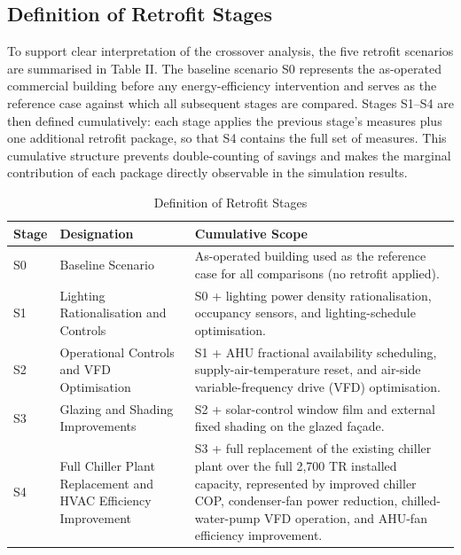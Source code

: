 \documentclass[journal,fleqn]{IEEEtran}
\renewcommand{\arraystretch}{1.08}
\begin{document}
\subsection{Definition of Retrofit Stages}

To support clear interpretation of the crossover analysis, the five retrofit scenarios are summarised in Table II. The baseline scenario S0 represents the as-operated commercial building before any energy-efficiency intervention and serves as the reference case against which all subsequent stages are compared. Stages S1--S4 are then defined cumulatively: each stage applies the previous stage's measures plus one additional retrofit package, so that S4 contains the full set of measures. This cumulative structure prevents double-counting of savings and makes the marginal contribution of each package directly observable in the simulation results.


\begin{table}[!t]
\caption{Definition of Retrofit Stages}
\label{tab:02}
\centering
\footnotesize
\setlength{\tabcolsep}{4pt}
\renewcommand{\arraystretch}{1.16}
\begin{tabularx}{\textwidth}{@{}>{\centering\arraybackslash}p{}>{\raggedright\arraybackslash}p{}>{\raggedright\arraybackslash}X@{}}
\toprule
\textbf{Stage} & \textbf{Designation} & \textbf{Cumulative Scope} \\
\midrule
S0 & Baseline Scenario & As-operated building used as the reference case for all comparisons (no retrofit applied). \\
S1 & Lighting Rationalisation and Controls & S0 + lighting power density rationalisation, occupancy sensors, and lighting-schedule optimisation. \\
S2 & Operational Controls and VFD Optimisation & S1 + AHU fractional availability scheduling, supply-air-temperature reset, and air-side variable-frequency drive (VFD) optimisation. \\
S3 & Glazing and Shading Improvements & S2 + solar-control window film and external fixed shading on the glazed façade. \\
S4 & Full Chiller Plant Replacement and HVAC Efficiency Improvement & S3 + full replacement of the existing chiller plant over the full 2,700 TR installed capacity, represented by improved chiller COP, condenser-fan power reduction, chilled-water-pump VFD operation, and AHU-fan efficiency improvement. \\
\bottomrule
\end{tabularx}
\end{table}
\end{document}
